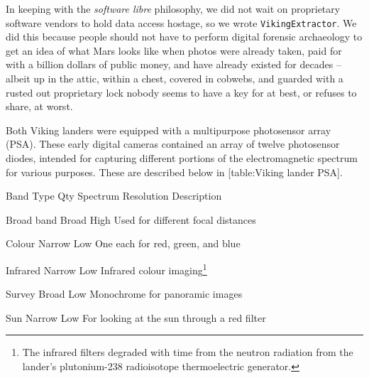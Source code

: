 
In keeping with the {\it software libre} philosophy, we did not wait on proprietary software vendors to hold data access hostage, so we wrote {\tt VikingExtractor}. We did this because people should not have to perform digital forensic archaeology to get an idea of what Mars looks like when photos were already taken, paid for with a billion dollars of public money, and have already existed for decades -- albeit up in the attic, within a chest, covered in cobwebs, and guarded with a rusted out proprietary lock nobody seems to have a key for at best, or refuses to share, at worst.

    {}

Both Viking landers were equipped with a multipurpose photosensor array (PSA). These early digital cameras contained an array of twelve photosensor diodes, intended for capturing different portions of the electromagnetic spectrum for various purposes. These are described below in [table:Viking lander PSA].

{
    \bTABLE[split=repeat,option=stretch]
    \setupTABLE[column][5]
        [width=.43\textwidth,
        align=yes]
    \setupTABLE[row][each][align=center]
    \setupTABLE[4][1][align=center]

\bTABLEhead
    \bTR[bottomframe=on]
      \bTH  Band Type \eTH
      \bTH  Qty \eTH
      \bTH  Spectrum \eTH
      \bTH  Resolution \eTH
      \bTH  Description \eTH
    \eTR
\eTABLEhead

\bTABLEbody
    \bTR
      \bTC Broad band \eTC
       \eTC
      \bTC Broad \eTC
      \bTC High \eTC
      \bTC Used for different focal distances \eTC
    \eTR

    \bTR
      \bTC Colour \eTC
       \eTC
      \bTC Narrow \eTC
      \bTC Low \eTC
      \bTC One each for red, green, and blue \eTC
    \eTR

    \bTR
      \bTC Infrared \eTC
       \eTC
      \bTC Narrow \eTC
      \bTC Low \eTC
      \bTC Infrared colour imaging\footnote{The infrared filters degraded with time from the neutron radiation from the lander's plutonium-238 radioisotope thermoelectric generator.} \eTC
    \eTR

    \bTR
      \bTC Survey \eTC
       \eTC
      \bTC Broad \eTC
      \bTC Low \eTC
      \bTC Monochrome for panoramic images \eTC
    \eTR
    
    \bTR
      \bTC Sun \eTC
       \eTC
      \bTC Narrow \eTC
      \bTC Low \eTC
      \bTC For looking at the sun through a red filter \eTC
    \eTR

\eTABLEbody

\eTABLE
}

